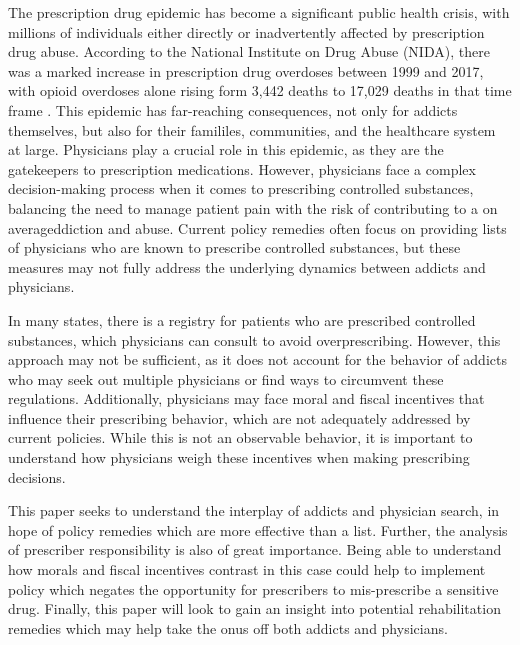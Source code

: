 \documentclass[11pt,a4paper]{article}
\begin{document}
The prescription drug epidemic has become a significant public health crisis, with millions of individuals either directly or inadvertently affected by prescription drug abuse. According to the National Institute on Drug Abuse (NIDA), there was a marked increase in prescription drug overdoses between 1999 and 2017, with opioid overdoses alone rising form 3,442 deaths to 17,029 deaths in that time frame \cite{nida_2025}. This epidemic has far-reaching consequences, not only for addicts themselves, but also for their famililes, communities, and the healthcare system at large. Physicians play a crucial role in this epidemic, as they are the gatekeepers to prescription medications. However,
physicians face a complex decision-making process when it comes to prescribing controlled substances, balancing the need to manage patient pain with the risk of contributing to a on averageddiction and abuse. Current policy remedies often focus on providing lists of physicians who are known to prescribe controlled substances, but these measures may not fully address the underlying dynamics between addicts and physicians.

In many states, there is a registry for patients who are prescribed controlled substances, which physicians can consult to avoid overprescribing. However, this approach may not be sufficient, as it does not account for the behavior of addicts who may seek out multiple physicians or find ways to circumvent these regulations. Additionally, physicians may face moral and fiscal incentives that influence their prescribing behavior, which are not adequately addressed by current policies. While this is not an observable behavior, it is important to understand how physicians weigh these incentives when making prescribing decisions.

This paper seeks to understand the interplay of addicts and physician search, in hope of policy remedies which are more effective than a list. Further, the analysis of prescriber responsibility is also of great importance. Being able to understand how morals and fiscal
incentives contrast in this case could help to implement policy which negates the opportunity for prescribers to mis-prescribe a sensitive drug. Finally, this paper will look to gain an insight into potential rehabilitation remedies which may help take the onus off both
addicts and physicians.



\end{document}
